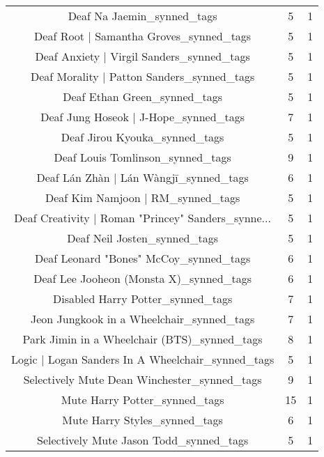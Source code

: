 \begin{table}[h!]
{\begin{tabular}{|c|c|c|}
                        Deaf Na Jaemin\_synned\_tags &           5 &          1 \\
           Deaf Root | Samantha Groves\_synned\_tags &           5 &          1 \\
         Deaf Anxiety | Virgil Sanders\_synned\_tags &           5 &          1 \\
        Deaf Morality | Patton Sanders\_synned\_tags &           5 &          1 \\
                      Deaf Ethan Green\_synned\_tags &           5 &          1 \\
             Deaf Jung Hoseok | J-Hope\_synned\_tags &           7 &          1 \\
                     Deaf Jirou Kyouka\_synned\_tags &           5 &          1 \\
                  Deaf Louis Tomlinson\_synned\_tags &           9 &          1 \\
            Deaf Lán Zhàn | Lán Wàngjī\_synned\_tags &           6 &          1 \\
                 Deaf Kim Namjoon | RM\_synned\_tags &           5 &          1 \\
Deaf Creativity | Roman "Princey" Sanders\_synne... &           5 &          1 \\
                      Deaf Neil Josten\_synned\_tags &           5 &          1 \\
            Deaf Leonard "Bones" McCoy\_synned\_tags &           6 &          1 \\
           Deaf Lee Jooheon (Monsta X)\_synned\_tags &           6 &          1 \\
                 Disabled Harry Potter\_synned\_tags &           7 &          1 \\
         Jeon Jungkook in a Wheelchair\_synned\_tags &           7 &          1 \\
      Park Jimin in a Wheelchair (BTS)\_synned\_tags &           8 &          1 \\
 Logic | Logan Sanders In A Wheelchair\_synned\_tags &           5 &          1 \\
      Selectively Mute Dean Winchester\_synned\_tags &           9 &          1 \\
                     Mute Harry Potter\_synned\_tags &          15 &          1 \\
                     Mute Harry Styles\_synned\_tags &           6 &          1 \\
           Selectively Mute Jason Todd\_synned\_tags &           5 &          1 \\

\end{tabular}}
\end{table}
